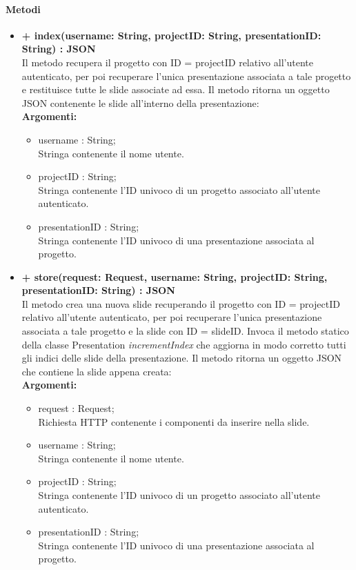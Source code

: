 	\paragraph{Metodi}
		\begin{itemize}
			\item \textbf{+ index(username: String, projectID: String, presentationID: String) : JSON}\\
				Il metodo recupera il progetto con ID = projectID relativo all'utente autenticato, per poi recuperare l'unica presentazione associata a tale progetto e restituisce tutte le slide associate ad essa. Il metodo ritorna un oggetto JSON contenente le slide all'interno della presentazione:\\
				\textbf{Argomenti:}
				\begin{itemize}
					\item username : String; \\
					Stringa contenente il nome utente.
					\item projectID : String; \\
					Stringa contenente l'ID univoco di un progetto associato all'utente autenticato.
					\item presentationID : String; \\
					Stringa contenente l'ID univoco di una presentazione associata al progetto.
				\end{itemize}
				
			\item \textbf{+ store(request: Request, username: String, projectID: String, presentationID: String) : JSON}\\
				Il metodo crea una nuova slide recuperando il progetto con ID = projectID relativo all'utente autenticato, per poi recuperare l'unica presentazione associata a tale progetto e la slide con ID = slideID. Invoca il metodo statico della classe Presentation \textit{incrementIndex} che aggiorna in modo corretto tutti gli indici delle slide della presentazione. Il metodo ritorna un oggetto JSON che contiene la slide appena creata:\\
				\textbf{Argomenti:}
				\begin{itemize}
					\item request : Request;\\
					Richiesta HTTP contenente i componenti da inserire nella slide.
					\item username : String; \\
					Stringa contenente il nome utente.
					\item projectID : String; \\
					Stringa contenente l'ID univoco di un progetto associato all'utente autenticato.
					\item presentationID : String; \\
					Stringa contenente l'ID univoco di una presentazione associata al progetto.
				\end{itemize}
				

\end{itemize}
